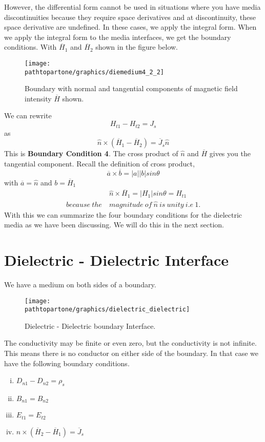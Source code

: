 However, the differential form cannot be used in situations where you have media discontinuities because they require space derivatives and at discontinuity, these space derivative are undefined. In these cases, we apply the integral form. When we apply the integral form to the media interfaces, we get the boundary conditions. With $\overline{H}_1$ and $\overline{H}_2$ shown in the figure below.
\begin{figure}[h]
\centering
\texttt{[image: \\pathtopartone/graphics/diemedium4\_2\_2]}
\caption{Boundary with normal and tangential components of magnetic field intensity $\overline{H}$ shown.}
\end{figure}

We can rewrite 
\begin{equation*}
H_{t1} - H_{t2} = J_s
\end{equation*}
as
\begin{equation}
\hat{n} \times (\overline{H}_1 - \overline{H}_2) = \overline{J}_s\hat{n}
\end{equation}
This is \textbf{Boundary Condition 4}. The cross product of $\hat{n}$ and $\overline{H}$ gives you the tangential component. Recall the definition of cross product,
\begin{equation*}
\overline{a}\times\overline{b} = \left|a \right| \left|b \right|sin\theta 
\end{equation*}
with $\overline{a} = \hat{n}$ and $ b = \overline{H}_1$
\begin{align*}
&\hat{n}\times\overline{H}_1 = \left|H_1 \right|sin\theta = H_{t1} \\ because\ the\ & magnitude\ of\ \hat{n}\ is\ unity\ i.e\ 1.
\end{align*}
With this we can summarize the four boundary conditions for the dielectric media as we have been discussing. We will do this in the next section.
\section{Dielectric - Dielectric Interface}
We have a medium on both sides of a boundary.
\begin{figure}[h]
\centering
\texttt{[image: \\pathtopartone/graphics/dielectric\_dielectric]}
\caption{Dielectric - Dielectric boundary Interface.}
\end{figure}

The conductivity may be finite or even zero, but the conductivity is not infinite. This means there is no conductor on either side of the boundary. In that case we have the following boundary conditions.
\begin{enumerate}[(i)]
\item $D_{n1} - D_{n2} = \rho_s$
\item $B_{n1} = B_{n2}$
\item $E_{t1} = E_{t2}$
\item $\hat{n} \times (\overline{H}_2 - \overline{H}_1) = \overline{J}_s$
\end{enumerate}


